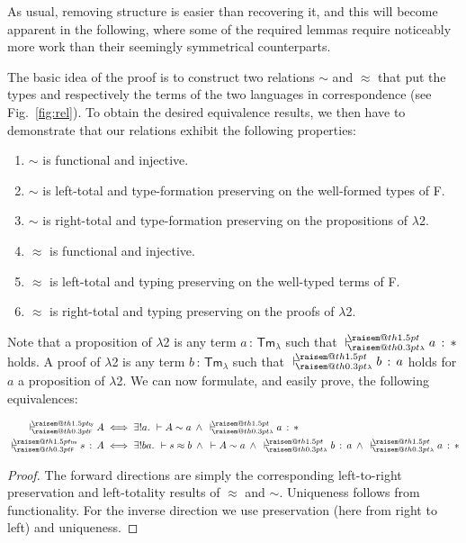 \documentclass[a4paper,UKenglish]{lipics-v2016}
\makeatletter
\newcommand{\ms}{\,}
\newcommand{\mrel}[1]{\mathrel{\ms #1 \ms}}
\newcommand{\OF}{\mrel{:}}
\newcommand{\mAnd}{\mrel{\wedge}}
\newcommand{\mExu}[1]{\ensuremath{\exists!} #1.\ms\ms}
\newcommand{\SysL}{$\lambda$2\xspace}
\newcommand{\TmL}{\ensuremath{\mathsf{Tm_{\lambda}}}}
\newcommand{\ty}{\mathsf{ty}}
\newcommand{\tm}{\mathsf{tm}}
\newcommand{\raisemath}[1]{\mathpalette{\raisem@th{#1}}}
\newcommand{\raisem@th}[3]{\raisebox{#1}{\ensuremath{#2#3}}}
\newcommand{\tsAnnot}[2]{\vdash\hspace{-.7em}^{\raisemath{1.5pt}{\scriptscriptstyle{#2}}}_{\raisemath{0.3pt}{\scriptscriptstyle{#1}}}} %
\newcommand{\tfF}{\tsAnnot{\mathsf{F}}{\ty}}  %
\newcommand{\tyF}{\tsAnnot{\mathsf{F}}{\tm}}  %
\newcommand{\istyF}[2]{\ensuremath{{#1} \mathrel{\tfF} #2}}
\newcommand{\typingF}[3]{\ensuremath{{#1} \mathrel{\tyF} #2 \OF #3}}
\newcommand{\tyL}{\tsAnnot{\lambda}{}} %
\newcommand{\typingL}[3]{\ensuremath{{#1} \mathrel{\tyL} #2 \OF #3}}
\newcommand{\tyr}{\mathrel{\sim}}
\newcommand{\tmr}{\mathrel{\approx}}
\newcommand{\Prp}{\ensuremath{\textrm{\textasteriskcentered}}}
\theoremstyle{plain}
\makeatother
\begin{document}
As usual, removing structure is easier than recovering it, and this will become apparent in the following, where some of the required lemmas require noticeably more work than their seemingly symmetrical counterparts.

The basic idea of the proof is to construct two relations $\tyr$ and $\tmr$ that put the types and respectively the terms of the two languages in correspondence (see Fig.~\ref{fig:rel}).
To obtain the desired equivalence results, we then have to demonstrate that our relations exhibit the following properties:
\begin{enumerate}
  \item $\tyr$ is functional and injective.
  \item $\tyr$ is left-total and type-formation preserving on the well-formed types of F.
  \item $\tyr$ is right-total and type-formation preserving on the propositions of \SysL.
  \item $\tmr$ is functional and injective.
  \item $\tmr$ is left-total and typing preserving on the well-typed terms of F.
  \item $\tmr$ is right-total and typing preserving on the proofs of \SysL.
\end{enumerate}
Note that a proposition of \SysL is any term $a \OF \TmL$ such that $\typingL{}{a}{\Prp}$ holds.
A proof of \SysL is any term $b \OF \TmL$ such that $\typingL{}{b}{a}$ holds for $a$ a proposition of \SysL.
We can now formulate, and easily prove, the following equivalences:

\begin{theorem}[Reductions from F to \SysL]
  \begin{align*}
    \istyF{}{A} &\iff \mExu{a} {} \vdash A \tyr a \mAnd \typingL{}{a}{\Prp}\\
    \typingF{}{s}{A} &\iff \mExu{b a} {} \vdash s \tmr b \mAnd {} \vdash A \tyr a \mAnd \typingL{}{b}{a} \mAnd \typingL{}{a}{\Prp}
  \end{align*}
\end{theorem}

\begin{proof}
  The forward directions are simply the corresponding left-to-right preservation and left-totality results of $\tmr$ and $\tyr$.
  Uniqueness follows from functionality.
  For the inverse direction we use preservation (here from right to left) and uniqueness.
\end{proof}
\end{document}
